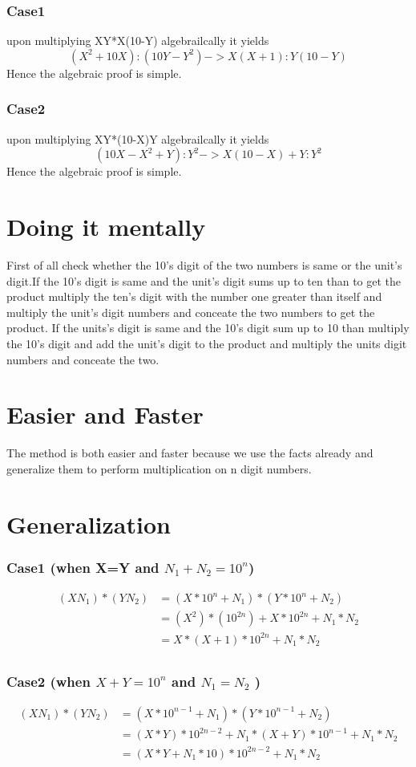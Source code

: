 \documentclass[a4paper]{article}
\begin{document}
\subsubsection*{Case1}
upon multiplying XY*X(10-Y) algebrailcally it yields
$$(X^2+10X):(10Y-Y^2) -> X(X+1):Y(10-Y)$$
Hence the algebraic proof is simple.

\subsubsection*{Case2}
upon multiplying XY*(10-X)Y algebrailcally it yields
$$(10X-X^2+Y):Y^2 -> X(10-X)+Y:Y^2$$
Hence the algebraic proof is simple.


\section*{Doing it mentally}
First of all check whether the 10's digit of the two numbers is same or the unit's digit.If the 10's digit is same and the unit's digit sums up to ten than to get the product multiply the ten's digit with the number one greater than itself and multiply the unit's digit numbers and conceate the two numbers to get the product.
If the units's digit is same and the 10's digit sum up to 10 than multiply the 10's digit and add the unit's digit to the product and multiply the units digit numbers and conceate the two.
\section*{Easier and Faster}
The method is both easier and faster because we use the facts already and generalize them to perform multiplication on n digit numbers.
\section*{Generalization}
\subsubsection*{Case1 (when X=Y and $N_1+N_2=10^{n}$)}
\begin{align*}
   (XN_1)*(YN_2) &= (X*10^n+N_1)*(Y*10^n+N_2)  \\
     &= (X^2)*(10^{2n})+X*10^{2n}+N_1*N_2  \\
     &= X*(X+1)*10^{2n}+N_1*N_2  \\
\end{align*}
\subsubsection*{Case2 (when $X+Y=10^{n}$ and $N_1=N_2$ )}
\begin{align*}
   (XN_1)*(YN_2) &= (X*10^{n-1}+N_1)*(Y*10^{n-1}+N_2)  \\
     &= (X*Y)*10^{2n-2}+N_1*(X+Y)*10^{n-1}+N_1*N_2 \\
     &= (X*Y+N_1*10)*10^{2n-2}+N_1*N_2 \\
\end{align*}




\end{document}
